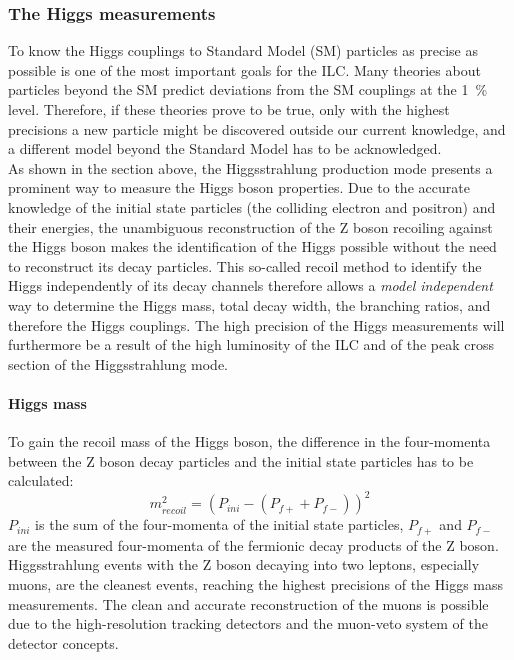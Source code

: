\subsubsection{The Higgs measurements}
To know the Higgs couplings to Standard Model (SM) particles as precise as possible is one of the most important goals for the ILC.
Many theories about particles beyond the SM predict deviations from the SM couplings at the \SI{1}{\percent} level.
Therefore, if these theories prove to be true, only with the highest precisions a new particle might be discovered outside our current knowledge, and a different model beyond the Standard Model has to be acknowledged.
\\As shown in the section above, the Higgsstrahlung production mode presents a prominent way to measure the Higgs boson properties.
Due to the accurate knowledge of the initial state particles (the colliding electron and positron) and their energies, the unambiguous reconstruction of the Z boson recoiling against the Higgs boson makes the identification of the Higgs possible without the need to reconstruct its decay particles.
This so-called recoil method to identify the Higgs independently of its decay channels therefore allows a \textit{model independent} way to determine the Higgs mass, total decay width, the branching ratios, and therefore the Higgs couplings. 
The high precision of the Higgs measurements will furthermore be a result of the high luminosity of the ILC and of the peak cross section of the Higgsstrahlung mode.

\paragraph{Higgs mass}
To gain the recoil mass of the Higgs boson, the difference in the four-momenta between the Z boson decay particles and the initial state particles has to be calculated:
\begin{equation}
 m_{recoil}^2=(P_{ini}-(P_{f+}+P_{f-}))^2
\end{equation}
$P_{ini}$ is the sum of the four-momenta of the initial state particles, $P_{f+}$ and $P_{f-}$ are the measured four-momenta of the fermionic decay products of the Z boson.\\
Higgsstrahlung events with the Z boson decaying into two leptons, especially muons, are the cleanest events, reaching the highest precisions of the Higgs mass measurements.
The clean and accurate reconstruction of the muons is possible due to the high-resolution tracking detectors and the muon-veto system of the detector concepts.

